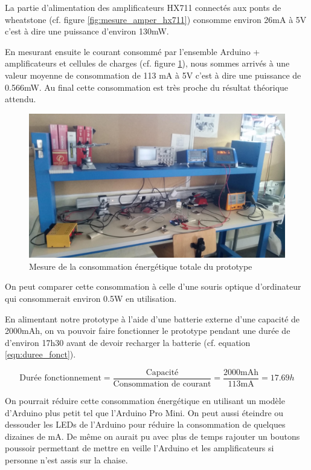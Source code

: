 \documentclass{polytech/polytech}
\begin{document}
La partie d'alimentation des amplificateurs HX711 connectés aux ponts de wheatstone (cf. figure \ref{fig:mesure_amper_hx711}) consomme environ 26mA à 5V c'est à dire une puissance d'environ 130mW.

En mesurant ensuite le courant consommé par l'ensemble Arduino + amplificateurs et cellules de charges (cf. figure \ref{fig:mesure_amper_tot}), nous sommes arrivés à une valeur moyenne de consommation de 113 mA à 5V c'est à dire une puissance de 0.566mW. Au final cette consommation est très proche du résultat théorique attendu.

\begin{figure}[htbp]
\begin{center}
\includegraphics[width=12cm]{image/mesure_de_consommation2}
\end{center}
\caption{Mesure de la consommation énergétique totale du prototype}
\label{fig:mesure_amper_tot}
\end{figure}

On peut comparer cette consommation à celle d'une souris optique d'ordinateur qui consommerait environ 0.5W en utilisation.

En alimentant notre prototype à l'aide d'une batterie externe d'une capacité de 2000mAh, on va pouvoir faire fonctionner le prototype pendant une durée de d'environ 17h30 avant de devoir recharger la batterie (cf. equation \eqref{eqn:duree_fonct}).

\begin{equation}
\label{eqn:duree_fonct}
\text{Durée fonctionnement}
=
\frac{\text{Capacité}}
{\text{Consommation de courant}}
= \frac{2000\text{mAh}}{113\text{mA}}
=17.69 h
\end{equation}


On pourrait réduire cette consommation énergétique en utilisant un modèle d'Arduino plus petit tel que l'Arduino Pro Mini. 
On peut aussi éteindre ou dessouder les LEDs de l'Arduino pour réduire la consommation de quelques dizaines de mA.
De même on aurait pu avec plus de temps rajouter un boutons poussoir permettant de mettre en veille l'Arduino et les amplificateurs si personne n'est assis sur la chaise.
\end{document}
